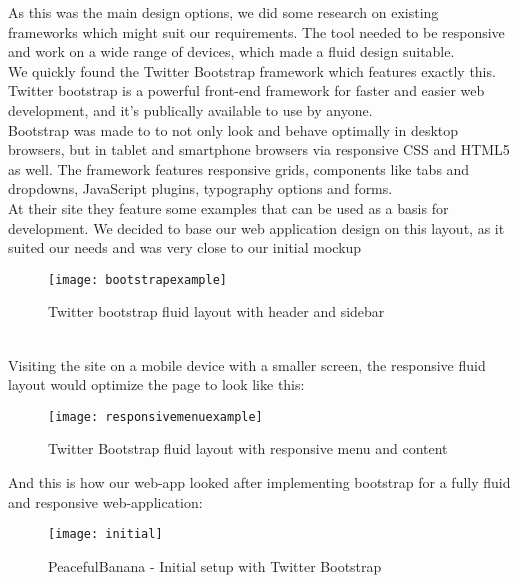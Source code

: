 As this was the main design options, we did some research on existing frameworks which might suit our requirements. The tool needed to be responsive and work on a wide range of devices, which made a fluid design suitable.\\ 
We quickly found the Twitter Bootstrap framework\cite{twitterbootstrap} which features exactly this. Twitter bootstrap is a powerful front-end framework for faster and easier web development, and it's publically available to use by anyone.\\Bootstrap was made to to not only look and behave optimally in desktop browsers, but in tablet and smartphone browsers via responsive CSS and HTML5 as well. The framework features responsive grids, components like tabs and dropdowns, JavaScript plugins, typography options and forms. \\
\newpage
At their site they feature some examples that can be used as a basis for development. We decided to base our web application design on this layout, as it suited our needs and was very close to our initial mockup
\begin{figure}[h!]
\label{bootstrapexample}
\centering
	\texttt{[image: bootstrapexample]}
\caption{Twitter bootstrap fluid layout with header and sidebar}
\end{figure}
\\
Visiting the site on a mobile device with a smaller screen, the responsive fluid layout would optimize the page to look like this:
\begin{figure}[h!]
\label{bootstrapresponsive}
\centering
	\texttt{[image: responsivemenuexample]}
\caption{Twitter Bootstrap fluid layout with responsive menu and content}
\end{figure}
\newpage
And this is how our web-app looked after implementing bootstrap for a fully fluid and responsive web-application:
\begin{figure}[h!]
\label{teamscreen}
\centering
	\texttt{[image: initial]}
\caption{PeacefulBanana - Initial setup with Twitter Bootstrap}
\end{figure}

